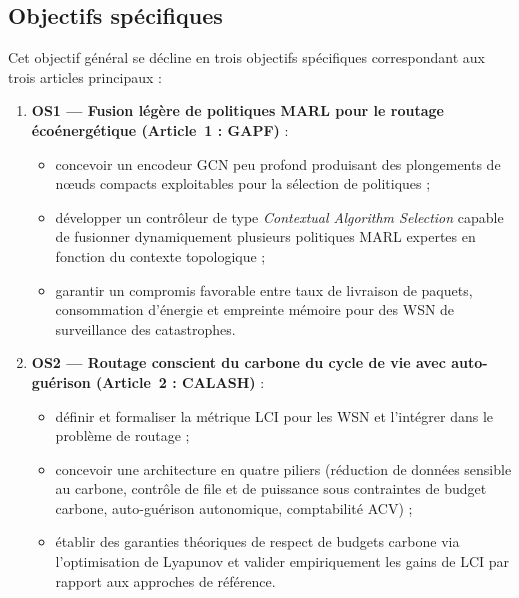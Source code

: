 \subsection{Objectifs spécifiques}

Cet objectif général se décline en trois objectifs spécifiques correspondant aux trois articles principaux :

\begin{enumerate}
  \item \textbf{OS1 — Fusion légère de politiques MARL pour le routage écoénergétique (Article~1 : GAPF)}\cite{rashid2018qmix,son2019qtran,liu2024gnncomm,Nguyen2025GNNIoT} :
  \begin{itemize}
    \item concevoir un encodeur GCN peu profond produisant des plongements de nœuds compacts exploitables pour la sélection de politiques ;
    \item développer un contrôleur de type \emph{Contextual Algorithm Selection} capable de fusionner dynamiquement plusieurs politiques MARL expertes en fonction du contexte topologique ;
    \item garantir un compromis favorable entre taux de livraison de paquets, consommation d'énergie et empreinte mémoire pour des WSN de surveillance des catastrophes.
  \end{itemize}

  \item \textbf{OS2 — Routage conscient du carbone du cycle de vie avec auto-guérison (Article~2 : CALASH)}\cite{pirson2021embodied,aioti2024carbon,mersy2025lca_data,itu_ict2025} :
  \begin{itemize}
    \item définir et formaliser la métrique LCI pour les WSN et l'intégrer dans le problème de routage ;
    \item concevoir une architecture en quatre piliers (réduction de données sensible au carbone, contrôle de file et de puissance sous contraintes de budget carbone, auto-guérison autonomique, comptabilité ACV) ;
    \item établir des garanties théoriques de respect de budgets carbone via l'optimisation de Lyapunov et valider empiriquement les gains de LCI par rapport aux approches de référence.
  \end{itemize}


\end{enumerate}
